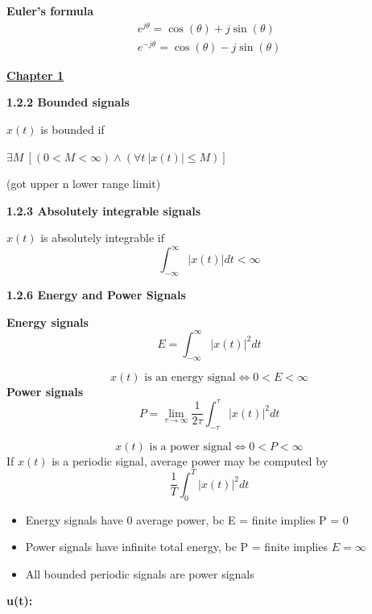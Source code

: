 \documentclass[landscape,a4paper]{extarticle}
\begin{document}
\fontsize{6}{7}\selectfont
{}\selectfont
\begin{multicols*}{5}
    \textbf{Euler's formula}
    \begin{align*}
        e^{j\theta}=\cos(\theta) + j\sin(\theta)\\
        e^{-j\theta}=\cos(\theta)-j\sin(\theta)
    \end{align*}

    \textbf{\uline{Chapter 1}}

    \textbf{1.2.2 Bounded signals}

    $x(t)$ is bounded if 

    $\exists M\ [(0 < M < \infty) \wedge (\forall t\ |x(t)| \leq M)]$

    (got upper n lower range limit)

    \textbf{1.2.3 Absolutely integrable signals}

    $x(t)$ is absolutely integrable if 
    \[
        \int_{-\infty}^{\infty}|x(t)| dt < \infty
    \]




    \textbf{1.2.6 Energy and Power Signals}

    \textbf{Energy signals}
    \[
        E = \int_{-\infty}^{\infty}|x(t)|^2 dt \tag{1.3a}
    \]
    
    \[
        x(t) \text{ is an energy signal} \iff 0 < E < \infty \tag{1.3b}
    \]
    \textbf{Power signals}
    \[
        P = \lim_{\tau \to \infty}\frac{1}{2\tau}\int_{-\tau}^{\tau}|x(t)|^2dt \tag{1.4a}
    \]

    \[
        x(t) \text{ is a power signal} \iff 0 < P < \infty \tag{1.4b}
    \]
    If $x(t)$ is a periodic signal, average power may be computed by
    \[
        \frac{1}{T}\int_0^T|x(t)|^2 dt
    \]
    \begin{itemize}
        \item Energy signals have 0 average power, bc E = finite implies P = 0
        \item Power signals have infinite total energy, bc P = finite implies $E = \infty$
        \item All bounded periodic signals are power signals
    \end{itemize}
    \textbf{u(t):}


\end{multicols*}
\end{document}
